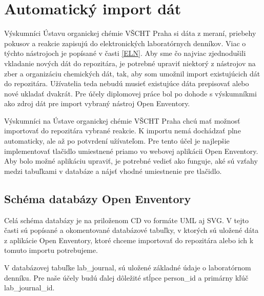 \documentclass[thesis=M,slovak]{FITthesis}[2013/05/06]
\begin{document}
\section{Automatický import dát}
Výskumníci Ústavu organickej chémie VŠCHT Praha si dáta z meraní, priebehy pokusov a reakcie zapisujú do elektronických laboratórnych denníkov. Viac o týchto nástrojoch je popísané v časti \ref{ELN}.
Aby sme čo najviac zjednodušili vkladanie nových dát do repozitára, je potrebné upraviť niektorý z nástrojov na zber a organizáciu chemických dát, tak, aby som umožnil import existujúcich dát do repozitára. Užívatelia teda nebudú musieť existujúce dáta prepisovať alebo nové ukladať dvakrát. Pre účely diplomovej práce bol po dohode s výskumníkmi ako zdroj dát pre import vybraný nástroj Open Enventory.

Výskumníci na Ústave organickej chémie VŠCHT Praha chcú mať možnosť importovať do repozitára vybrané reakcie. K importu nemá dochádzať plne automaticky, ale až po potvrdení užívateľom. Pre tento účel je najlepšie implementovať tlačidlo umiestnené priamo vo webovej aplikácii Open Enventory. Aby bolo možné aplikáciu upraviť, je potrebné vedieť ako funguje, aké sú vzťahy medzi tabuľkami v databáze a nájsť vhodné umiestnenie pre tlačidlo.

\subsection{Schéma databázy Open Enventory}
Celá schéma databázy je na priloženom CD vo formáte UML aj SVG. V tejto časti sú popísané a okomentované databázové tabuľky, v ktorých sú uložené dáta z aplikácie Open Enventory, ktoré chceme importovať do repozitára alebo ich k tomuto importu potrebujeme.


V databázovej tabuľke lab\_journal, sú uložené základné údaje o laboratórnom denníku. Pre naše účely budú ďalej dôležité stĺpce person\_id a primárny kľúč lab\_journal\_id.

\end{document}
